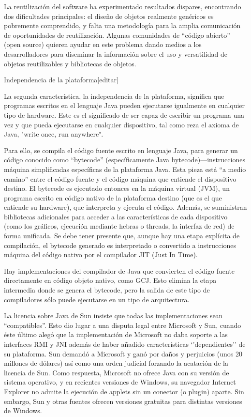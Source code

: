 \documentclass[11pt,a4paper]{$type}
\begin{document}
	\bigskip
							La reutilización del software ha experimentado resultados dispares, encontrando dos dificultades principales: el diseño de objetos realmente genéricos es pobremente comprendido, y falta una metodología para la amplia comunicación de oportunidades de reutilización. Algunas comunidades de “código abierto” (open source) quieren ayudar en este problema dando medios a los desarrolladores para diseminar la información sobre el uso y versatilidad de objetos reutilizables y bibliotecas de objetos.
	\bigskip
							
	\bigskip
							Independencia de la plataforma[editar]
	\bigskip
							
	\bigskip
							La segunda característica, la independencia de la plataforma, significa que programas escritos en el lenguaje Java pueden ejecutarse igualmente en cualquier tipo de hardware. Este es el significado de ser capaz de escribir un programa una vez y que pueda ejecutarse en cualquier dispositivo, tal como reza el axioma de Java, "write once, run anywhere".
	\bigskip
							
	\bigskip
							Para ello, se compila el código fuente escrito en lenguaje Java, para generar un código conocido como “bytecode” (específicamente Java bytecode)—instrucciones máquina simplificadas específicas de la plataforma Java. Esta pieza está “a medio camino” entre el código fuente y el código máquina que entiende el dispositivo destino. El bytecode es ejecutado entonces en la máquina virtual (JVM), un programa escrito en código nativo de la plataforma destino (que es el que entiende su hardware), que interpreta y ejecuta el código. Además, se suministran bibliotecas adicionales para acceder a las características de cada dispositivo (como los gráficos, ejecución mediante hebras o threads, la interfaz de red) de forma unificada. Se debe tener presente que, aunque hay una etapa explícita de compilación, el bytecode generado es interpretado o convertido a instrucciones máquina del código nativo por el compilador JIT (Just In Time).
	\bigskip
							
	\bigskip
							Hay implementaciones del compilador de Java que convierten el código fuente directamente en código objeto nativo, como GCJ. Esto elimina la etapa intermedia donde se genera el bytecode, pero la salida de este tipo de compiladores sólo puede ejecutarse en un tipo de arquitectura.
	\bigskip
							
	\bigskip
							La licencia sobre Java de Sun insiste que todas las implementaciones sean “compatibles”. Esto dio lugar a una disputa legal entre Microsoft y Sun, cuando éste último alegó que la implementación de Microsoft no daba soporte a las interfaces RMI y JNI además de haber añadido características ‘’dependientes’’ de su plataforma. Sun demandó a Microsoft y ganó por daños y perjuicios (unos 20 millones de dólares) así como una orden judicial forzando la acatación de la licencia de Sun. Como respuesta, Microsoft no ofrece Java con su versión de sistema operativo, y en recientes versiones de Windows, su navegador Internet Explorer no admite la ejecución de applets sin un conector (o plugin) aparte. Sin embargo, Sun y otras fuentes ofrecen versiones gratuitas para distintas versiones de Windows.
	\bigskip
							
\end{document}
